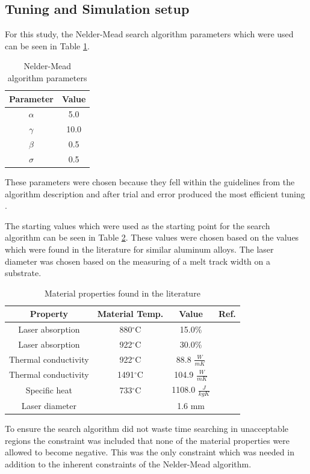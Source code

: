 \documentclass[pdflatex,sn-mathphys]{sn-jnl}
\newcommand{\degree}{$^\circ$}
\begin{document}
	\subsection{Tuning and Simulation setup}
	\label{sim_setup}

	For this study, the Nelder-Mead search algorithm parameters which were used can be seen in Table \ref{tab:nm_parameters}.
	\begin{table}[!htb]
		\centering
		\caption{Nelder-Mead algorithm parameters}
		\label{tab:nm_parameters}
			\begin{tabular}{|c|c|} \hline 
				Parameter & Value \\ \hline
				$\alpha$ & 5.0 \\ \hline
				$\gamma$ & 10.0 \\ \hline
				$\beta$ & 0.5 \\ \hline
				$\sigma$ & 0.5 \\ \hline
			\end{tabular}
	\end{table}
	These parameters were chosen because they fell within the guidelines from the algorithm description and after trial and error produced the most efficient tuning \cite{nelder_1965}.
	
	The starting values which were used as the starting point for the search algorithm can be seen in Table \ref{tab:starting_mat_prop_complete}.  These values were chosen based on the values which were found in the literature for similar aluminum alloys.  The laser diameter was chosen based on the measuring of a melt track width on a substrate. 
	\begin{table}[!htb]
		\centering
		\caption{Material properties found in the literature}
		\label{tab:starting_mat_prop_complete}
			\begin{tabular}{|c|c|c|c|} \hline 
				Property & Material Temp. & Value & Ref. \\ \hline
				Laser absorption & 880\degree C & 15.0\% & \cite{boyden_temperature_2006} \\ \hline
				Laser absorption & 922\degree C & 30.0\% & \cite{boyden_temperature_2006} \\ \hline
				Thermal conductivity & 922\degree C & 88.8 $\frac{W}{mK}$ & \cite{leitner_thermophysical_2017}\\ \hline
				Thermal conductivity & 1491\degree C & 104.9 $\frac{W}{mK}$ & \cite{leitner_thermophysical_2017}\\ \hline
				Specific heat & 733\degree C & 1108.0 $\frac{J}{kgK}$ & \cite{leitner_thermophysical_2017}\\ \hline
				Laser diameter & & 1.6 mm & \\ \hline
			\end{tabular}
	\end{table}
	To ensure the search algorithm did not waste time searching in unacceptable regions the constraint was included that none of the material properties were allowed to become negative.  This was the only constraint which was needed in addition to the inherent constraints of the Nelder-Mead algorithm.
	
\end{document}
